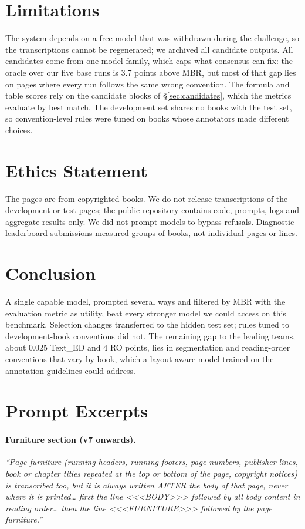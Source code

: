 \documentclass[11pt]{article}
\newcommand{\ted}{Text\_ED}
\newcommand{\ro}{RO}
\begin{document}
\section*{Limitations}
The system depends on a free model that was withdrawn during the challenge, so the transcriptions cannot be regenerated; we archived all candidate outputs. All candidates come from one model family, which caps what consensus can fix: the oracle over our five base runs is 3.7 points above MBR, but most of that gap lies on pages where every run follows the same wrong convention. The formula and table scores rely on the candidate blocks of \S\ref{sec:candidates}, which the metrics evaluate by best match. The development set shares no books with the test set, so convention-level rules were tuned on books whose annotators made different choices.

\section*{Ethics Statement}
The pages are from copyrighted books. We do not release transcriptions of the development or test pages; the public repository contains code, prompts, logs and aggregate results only. We did not prompt models to bypass refusals. Diagnostic leaderboard submissions measured groups of books, not individual pages or lines.

\section{Conclusion}
A single capable model, prompted several ways and filtered by MBR with the evaluation metric as utility, beat every stronger model we could access on this benchmark. Selection changes transferred to the hidden test set; rules tuned to development-book conventions did not. The remaining gap to the leading teams, about 0.025 \ted{} and 4 \ro{} points, lies in segmentation and reading-order conventions that vary by book, which a layout-aware model trained on the annotation guidelines could address.



\appendix

\section{Prompt Excerpts}
\label{app:prompts}
\paragraph{Furniture section (v7 onwards).} \emph{``Page furniture (running headers, running footers, page numbers, publisher lines, book or chapter titles repeated at the top or bottom of the page, copyright notices) is transcribed too, but it is always written AFTER the body of that page, never where it is printed\ldots{} first the line {<}{<}{<}BODY{>}{>}{>} followed by all body content in reading order\ldots{} then the line {<}{<}{<}FURNITURE{>}{>}{>} followed by the page furniture.''}
\end{document}
